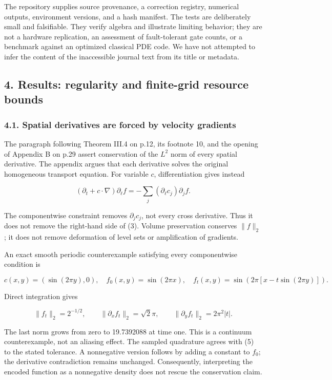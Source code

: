The repository supplies source provenance, a correction registry,
numerical outputs, environment versions, and a hash manifest. The tests
are deliberately small and falsifiable. They verify algebra and
illustrate limiting behavior; they are not a hardware replication, an
assessment of fault-tolerant gate counts, or a benchmark against an
optimized classical PDE code. We have not attempted to infer the content
of the inaccessible journal text from its title or metadata.

\subsection{4. Results: regularity and finite-grid resource
bounds}\label{results-regularity-and-finite-grid-resource-bounds}

\subsubsection{4.1. Spatial derivatives are forced by velocity
gradients}\label{spatial-derivatives-are-forced-by-velocity-gradients}

The paragraph following Theorem III.4 on p.12, its footnote 10, and the
opening of Appendix B on p.29 assert conservation of the \(L^2\) norm of
every spatial derivative. The appendix argues that each derivative
solves the original homogeneous transport equation. For variable \(c\),
differentiation gives instead

\[
(\partial_t+c\cdot\nabla)\partial_\ell f
=-\sum_j(\partial_\ell c_j)\partial_j f. \tag{3}
\]

The componentwise constraint removes \(\partial_jc_j\), not every cross
derivative. Thus it does not remove the right-hand side of (3). Volume
preservation conserves \(\|f\|_2\); it does not remove deformation of
level sets or amplification of gradients.

An exact smooth periodic counterexample satisfying every componentwise
condition is

\[
c(x,y)=(\sin(2\pi y),0),\quad f_0(x,y)=\sin(2\pi x),\quad
f_t(x,y)=\sin(2\pi[x-t\sin(2\pi y)]). \tag{4}
\]

Direct integration gives

\[
\|f_t\|_2=2^{-1/2},\qquad
\|\partial_x f_t\|_2=\sqrt2\pi,\qquad
\|\partial_y f_t\|_2=2\pi^2|t|. \tag{5}
\]

The last norm grows from zero to 19.7392088 at time one. This is a
continuum counterexample, not an aliasing effect. The sampled quadrature
agrees with (5) to the stated tolerance. A nonnegative version follows
by adding a constant to \(f_0\); the derivative contradiction remains
unchanged. Consequently, interpreting the encoded function as a
nonnegative density does not rescue the conservation claim.

